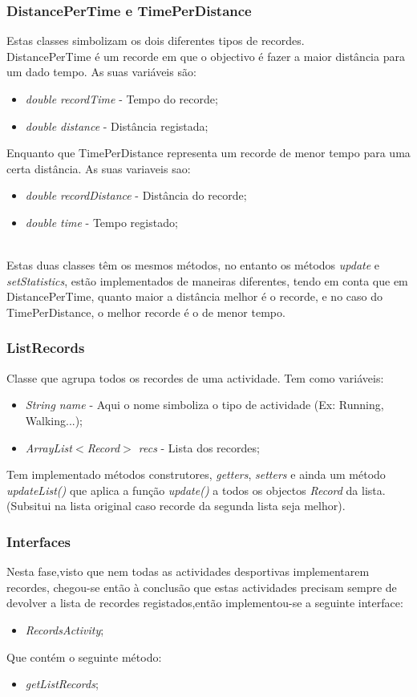 \documentclass[10pt,notitlepage]{article}
\begin{document}
\subsubsection{DistancePerTime e TimePerDistance}
Estas classes simbolizam os dois diferentes tipos de recordes.\\

DistancePerTime é um recorde em que o objectivo é fazer a maior distância para um dado tempo.
As suas variáveis são:
\begin{itemize}
\item \textit{double recordTime} - Tempo do recorde;
\item \textit{double distance} - Distância registada;
\end{itemize}
Enquanto que TimePerDistance representa um recorde de menor tempo para uma certa distância.
As suas variaveis sao:
\begin{itemize}
\item \textit{double recordDistance} - Distância do recorde;
\item \textit{double time} - Tempo registado;
\end{itemize}
~\\
Estas duas classes têm os mesmos métodos, no entanto os métodos \textit{update} e \textit{setStatistics}, estão implementados de maneiras diferentes, tendo em conta que em DistancePerTime, quanto maior a distância melhor é o recorde, e no caso do TimePerDistance,  o melhor recorde é o de menor tempo.


\subsubsection{ListRecords}

Classe que agrupa todos os recordes de uma actividade. Tem como variáveis:
\begin{itemize}
\item \textit{String name} - Aqui o nome simboliza o tipo de actividade (Ex: Running, Walking...);
\item \textit{ArrayList$<$Record$>$ recs} - Lista dos recordes;
\end{itemize}
Tem implementado métodos construtores, \textit{getters}, \textit{setters} e ainda um método \textit{updateList()} que aplica a função \textit{update()} a todos os objectos \textit{Record} da lista. (Subsitui na lista original caso recorde da segunda lista seja melhor).
\subsubsection{Interfaces}
Nesta fase,visto que nem todas as actividades desportivas implementarem recordes, chegou-se então à conclusão que estas actividades precisam sempre de devolver a lista de recordes registados,então implementou-se a seguinte interface:
\begin{itemize}
\item \textit{RecordsActivity};
\end{itemize}
Que contém o seguinte método:
\begin{itemize}
\item \textit{getListRecords};
\end{itemize}
\end{document}
